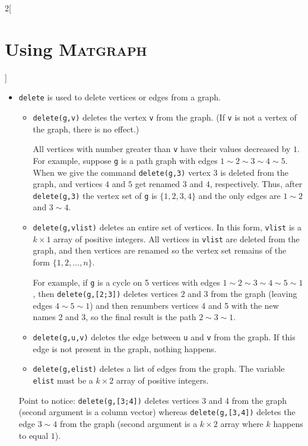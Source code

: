 \documentclass{amsart}
\newcommand\matgraph{\textsc{Matgraph}}
\begin{document}
\begin{multicols}{2}[\section{Using \matgraph}]
\begin{itemize}
  Remember: The vertex set of all graphs in \matgraph\ are always of
  the form $\{1,2,\ldots,n\}$ where $n\ge0$.


\item \verb|delete| is used to delete vertices or edges from a
  graph. 

  \begin{itemize}
  \item \verb|delete(g,v)| deletes the vertex \verb|v| from the graph.
    (If \verb|v| is not a vertex of the graph, there is no effect.)
    
    All vertices with number greater than \verb|v| have their values
    decreased by $1$. For example, suppose \verb|g| is a path graph
    with edges $1\sim2\sim3\sim4\sim5$.  When we give the command
    \verb|delete(g,3)| vertex $3$ is deleted from the graph, and
    vertices $4$ and $5$ get renamed $3$ and $4$, respectively.  Thus,
    after \verb|delete(g,3)| the vertex set of \verb|g| is
    $\{1,2,3,4\}$ and the only edges are $1\sim2$ and $3\sim4$.
    
  \item \verb|delete(g,vlist)| deletes an entire set of vertices. In
    this form, \verb|vlist| is a $k\times 1$ array of positive
    integers. All vertices in \verb|vlist| are deleted from the graph,
    and then vertices are renamed so the vertex set remains of the
    form $\{1,2,\ldots,n\}$.
    
    For example, if \verb|g| is a cycle on 5 vertices with edges
    $1\sim2\sim3\sim4\sim5\sim1$, then \verb|delete(g,[2;3])| deletes
    vertices $2$ and $3$ from the graph (leaving edges $4\sim 5 \sim
    1$) and then renumbers vertices 4 and 5 with the new names 2 and
    3, so the final result is the path $2\sim3\sim1$.
    
  \item \verb|delete(g,u,v)| deletes the edge between \verb|u| and
    \verb|v| from the graph. If this edge is not present in the graph,
    nothing happens.
    
  \item \verb|delete(g,elist)| deletes a list of edges from the graph.
    The variable \verb|elist| must be a $k\times 2$ array of positive
    integers. 
  \end{itemize}
  
  Point to notice: \verb|delete(g,[3;4])| deletes vertices 3 and 4
  from the graph (second argument is a column vector) whereas
  \verb|delete(g,[3,4])| deletes the edge $3\sim4$ from the graph
  (second argument is a $k\times 2$ array where $k$ happens to equal
  $1$).


\end{itemize}
\end{multicols}
\end{document}
